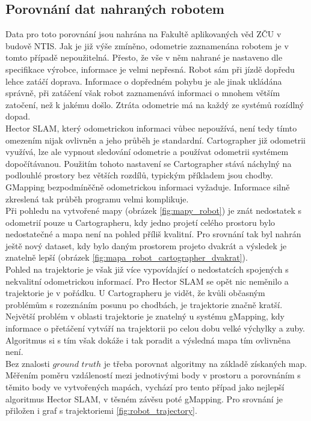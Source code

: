 \documentclass[12pt]{report}
\begin{document}
\subsection{Porovnání dat nahraných robotem} \label{sekce:data_robot}
Data pro toto porovnání jsou nahrána na Fakultě aplikovaných věd ZČU v budově NTIS. Jak je již výše zmíněno, odometrie zaznamenána robotem je v tomto případě nepoužitelná. Přesto, že vše v něm nahrané je nastaveno dle specifikace výrobce, informace je velmi nepřesná. Robot sám při jízdě dopředu lehce zatáčí doprava. Informace o dopředném pohybu je ale jinak ukládána správně, při zatáčení však robot zaznamenává informaci o mnohem větším zatočení, než k jakému došlo. Ztráta odometrie má na každý ze systémů rozídlný dopad.\\
\indent Hector SLAM, který odometrickou informaci vůbec nepoužívá, není tedy tímto omezením nijak ovlivněn a jeho průběh je standardní. Cartographer již odometrii využívá, lze ale vypnout sledování odometrie a používat odometrii systémem dopočítávanou. Použitím tohoto nastavení se Cartographer stává náchylný na podlouhlé prostory bez větších rozdílů, typickým příkladem jsou chodby. GMapping bezpodmíněčně odometrickou informaci vyžaduje. Informace silně zkreslená tak průběh programu velmi komplikuje.\\
\indent Při pohledu na vytvořené mapy (obrázek \ref{fig:mapy_robot}) je znát nedostatek s odometrií pouze u Cartographeru, kdy jedno projetí celého prostoru bylo nedostatečné a mapa není na pohled příliš kvalitní. Pro srovnání tak byl nahrán ještě nový dataset, kdy bylo daným prostorem projeto dvakrát a výsledek je znatelně lepší (obrázek \ref{fig:mapa_robot_cartographer_dvakrat}).\\
\indent Pohled na trajektorie je však již více vypovídající o nedostatcích spojených s nekvalitní odometrickou informací. Pro Hector SLAM se opět nic neměnilo a trajektorie je v pořádku. U Cartographeru je vidět, že kvůli občasným problémům s rozeznáním posunu po chodbách, je trajektorie značně kratší. Největší problém v oblasti trajektorie je znatelný u systému gMapping, kdy informace o přetáčení vytváří na trajektorii po celou dobu velké výchylky a zuby. Algoritmus si s tím však dokáže i tak poradit a výsledná mapa tím ovlivněna není.\\
\indent Bez znalosti $ground$ $truth$ je třeba porovnat algoritmy na základě získaných map. Měřením poměru vzdáleností mezi jednotivými body v prostoru a porovnáním s těmito body ve vytvořených mapách, vychází pro tento případ jako nejlepší algoritmus Hector SLAM, v těsném závěsu poté gMapping. Pro srovnání je přiložen i graf s trajektoriemi \ref{fig:robot_trajectory}. 
\end{document}
